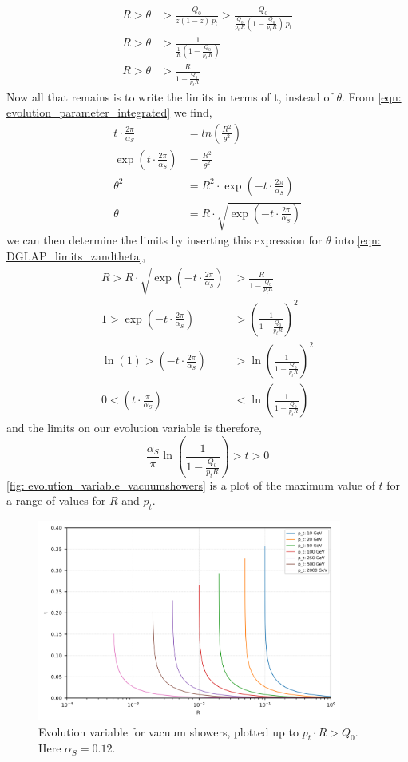 \documentclass[main.tex]{subfiles}
\begin{document}
\begin{align}
    R>\theta &>\frac{Q_0}{z(1-z)\, p_t} > \frac{Q_0}{\frac{Q_0}{p_t \, R}(1-\frac{Q_0}{p_t \, R})\, p_t} \nonumber\\
    R>\theta &>\frac{1}{\frac{1}{R} (1-\frac{Q_0}{p_t \, R})} \nonumber\\
    R>\theta &>\frac{R}{1 - \frac{Q_0}{p_t R}} \label{eqn: DGLAP_limits_zandtheta}
\end{align}
Now all that remains is to write the limits in terms of t, instead of \(\theta\). From \autoref{eqn: evolution_parameter_integrated} we find, 
\begin{align}
    t\cdot \frac{2\pi}{\alpha_S} &= ln\left(\frac{R^2}{\theta^2} \right) \nonumber \\
    \exp \left(t\cdot \frac{2\pi}{\alpha_S} \right) &= \frac{R^2}{\theta^2} \nonumber \\
    \theta^2 &= R^2 \cdot \exp \left(- t\cdot \frac{2\pi}{\alpha_S} \right) \nonumber \\
    \theta &= R \cdot \sqrt{\exp\left(-t\cdot \frac{2\pi}{\alpha_S}\right)}
\end{align}
we can then determine the limits by inserting this expression for \(\theta\) into \autoref{eqn: DGLAP_limits_zandtheta}, 
\begin{align}
    R> R \cdot \sqrt{\exp\left(-t\cdot \frac{2\pi}{\alpha_S}\right)} &>\frac{R}{1 - \frac{Q_0}{p_t R}} \nonumber \\
    1> \exp\left(-t\cdot \frac{2\pi}{\alpha_S}\right) &> \left(\frac{1}{1 - \frac{Q_0}{p_t R}}\right)^2 \nonumber \\
    \ln(1)> \left(-t\cdot \frac{2\pi}{\alpha_S}\right) &> \ln(\frac{1}{1 - \frac{Q_0}{p_t R}})^2 \nonumber \\
     0< \left(t\cdot \frac{\pi}{\alpha_S}\right) &< \ln(\frac{1}{1 - \frac{Q_0}{p_t R}}) 
\end{align}
and the limits on our evolution variable is therefore, 
\begin{equation}\label{eqn: evolution_parameter_boundaries}
    \frac{\alpha_S}{\pi} \ln(\frac{1}{1 - \frac{Q_0}{p_t R}}) > t > 0
\end{equation}
\autoref{fig: evolution_variable_vacuumshowers} is a plot of the maximum value of \(t\) for a range of values for \(R\) and \(p_t\). 
\begin{figure}[h]
    \centering
    \includegraphics[width=10cm]{pictures/misc/evolution_variable_vacuumshowers.png}
    \caption{Evolution variable for vacuum showers, plotted up to \(p_t\cdot R > Q_0\). Here \(\alpha_S = 0.12\).}
    \label{fig: evolution_variable_vacuumshowers}
\end{figure}
\end{document}
